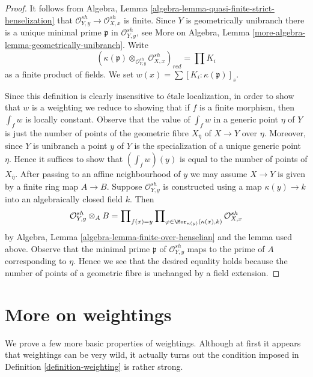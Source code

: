 \begin{proof}
It follows from Algebra, Lemma
\ref{algebra-lemma-quasi-finite-strict-henselization}
that $\mathcal{O}_{Y, y}^{sh} \to \mathcal{O}_{X, x}^{sh}$
is finite. Since $Y$ is geometrically unibranch
there is a unique minimal prime $\mathfrak p$ in
$\mathcal{O}_{Y, y}^{sh}$, see
More on Algebra, Lemma \ref{more-algebra-lemma-geometrically-unibranch}.
Write
$$
(\kappa(\mathfrak p) \otimes_{\mathcal{O}_{Y, y}^{sh}}
\mathcal{O}_{X, x}^{sh})_{red} =
\prod K_i
$$
as a finite product of fields.
We set $w(x) = \sum [K_i : \kappa(\mathfrak p)]_s$.

\medskip\noindent
Since this definition is clearly insensitive to \'etale localization,
in order to show that $w$ is a weighting we reduce to showing that if
$f$ is a finite morphism, then $\int_f w$ is locally constant.
Observe that the value of $\int_f w$ in a generic point $\eta$
of $Y$ is just the number of points of the geometric fibre
$X_{\overline{\eta}}$ of $X \to Y$ over $\eta$. Moreover, since
$Y$ is unibranch a point $y$ of $Y$ is the specialization of a unique
generic point $\eta$. Hence it suffices to show that $(\int_f w)(y)$
is equal to the number of points of $X_{\overline{\eta}}$.
After passing to an affine neighbourhood of $y$ we may assume
$X \to Y$ is given by a finite ring map $A \to B$. Suppose
$\mathcal{O}_{Y, y}^{sh}$ is constructed using a map
$\kappa(y) \to k$ into an algebraically closed field $k$.
Then
$$
\mathcal{O}_{Y, y}^{sh} \otimes_A B =
\prod\nolimits_{f(x) = y}
\prod\nolimits_{\varphi \in \Mor_{\kappa(y)}(\kappa(x), k)}
\mathcal{O}_{X, x}^{sh}
$$
by Algebra, Lemma \ref{algebra-lemma-finite-over-henselian}
and the lemma used above.
Observe that the minimal prime $\mathfrak p$ of $\mathcal{O}_{Y, y}^{sh}$
maps to the prime of $A$ corresponding to $\eta$. Hence we see that
the desired equality holds because the number of points of a geometric
fibre is unchanged by a field extension.
\end{proof}



\section{More on weightings}
\label{section-more-weightings}

\noindent
We prove a few more basic properties of weightings. Although
at first it appears that weightings can be very wild, it
actually turns out the condition imposed in
Definition \ref{definition-weighting} is rather strong.

